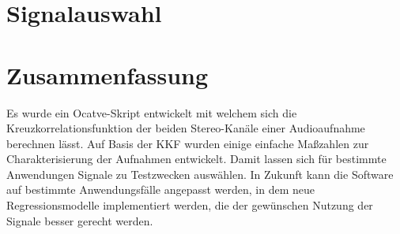 \section{Signalauswahl}

\newpage
\section{Zusammenfassung}
Es wurde ein Ocatve-Skript entwickelt mit welchem sich die Kreuzkorrelationsfunktion der beiden Stereo-Kanäle einer Audioaufnahme berechnen lässt. Auf Basis der KKF wurden einige einfache Maßzahlen zur Charakterisierung der Aufnahmen entwickelt. Damit lassen sich für bestimmte Anwendungen Signale zu Testzwecken auswählen.
In Zukunft kann die Software auf bestimmte Anwendungsfälle angepasst werden, in dem neue Regressionsmodelle implementiert werden, die der gewünschen Nutzung der Signale besser gerecht werden.
